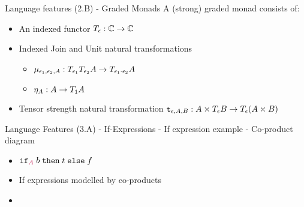 \documentclass{beamer}
\newcommand\script[1]{}
\begin{document}
\begin{frame}{Language features (2.B) - Graded Monads}
    A (strong) graded monad consists of:
        \begin{itemize}
            \item An indexed functor $T_{\epsilon}{}: \mathbb{C}\rightarrow \mathbb{C}$
            \item Indexed Join and Unit natural transformations
            \begin{itemize}
                \item  $\mu_{\epsilon_1, \epsilon_2, A}: T_{\epsilon_1}{T_{\epsilon_2}{A}}\rightarrow T_{\epsilon_1\cdot \epsilon_2}{A}$\
                \item $\eta_{A}: A\rightarrow T_{\texttt{1}}{A}$
            \end{itemize}
            \item Tensor strength natural transformation $\texttt{t}_{\epsilon, A, B}: A\times T_{\epsilon}{B}\rightarrow T_{\epsilon}{(A\times B)}$
        \end{itemize}

        \script{
            - A solution is a graded monad.
            - We now have one functor, indexed by a monoid of effect symbols. The rules and morphisms stay the same but are now also indexed. 

        }    
\end{frame}

\begin{frame}{Language Features (3.A) - If-Expressions}
    - If expression example
    - Co-product diagram

    \begin{itemize}
        \item $\texttt{if}_{\textcolor{purple}{A}}\; b\; \texttt{then}\; t \;\texttt{else} \; f\;$
        \item If expressions modelled by co-products
        \item 
    \end{itemize}
    


    \script{
        - Finally, we may want to add if expressions to our language. 
        - This can be fairly easily be done using co-products (the generalisation of what disjoint unions on sets are)
     }
\end{frame}
\end{document}
